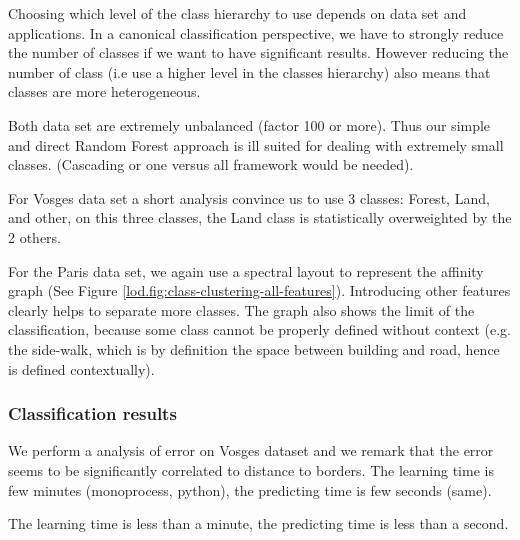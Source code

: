 		Choosing which level of the class hierarchy to use depends on data set and applications.
		In a canonical classification perspective, we have to strongly reduce the number of classes if we want to have significant results.
		However reducing the number of class (i.e use a higher level in the classes hierarchy) also means that classes are more heterogeneous.
		  
		Both data set are extremely unbalanced (factor 100 or more). Thus our simple and direct Random Forest approach is ill suited for dealing with extremely small classes. (Cascading or one versus all framework would be needed).
		
		For Vosges data set a short analysis convince us to use 3 classes: Forest, Land, and other, on this three classes, the Land class is statistically overweighted by the 2 others.
		
		For the Paris data set, we again use a spectral layout to represent the affinity graph (See Figure \ref{lod.fig:class-clustering-all-features}).
		Introducing other features clearly helps to separate more classes.
		The graph also shows the limit of the classification, because some class cannot be properly defined without context (e.g. the side-walk, which is by definition the space between building and road, hence is defined contextually). 
		
		\subsubsection{Classification results}
		We perform a analysis of error on Vosges dataset and we remark that the error seems to be significantly correlated to distance to borders.
		The learning time is few minutes (monoprocess, python), the predicting time is few seconds (same).
				 
		The learning time is less than a minute, the predicting time is less than a second. 
		
